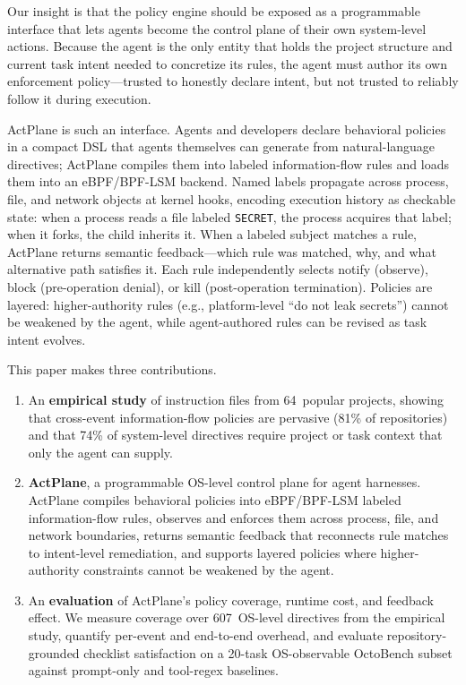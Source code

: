 Our insight is that the policy engine should be exposed as a
programmable interface that lets agents become the control plane of
their own system-level actions. Because the agent is the only entity
that holds the project structure and current task intent needed to
concretize its rules, the agent must author its own enforcement
policy---trusted to honestly declare intent, but not trusted to
reliably follow it during execution.

ActPlane is such an interface. Agents and developers declare behavioral
policies in a compact DSL that agents themselves can generate from
natural-language directives; ActPlane compiles them into labeled
information-flow rules and loads them into an eBPF/BPF-LSM backend. Named
labels propagate across process, file, and network objects at kernel hooks,
encoding execution history as checkable state: when a process reads a file
labeled \texttt{SECRET}, the process acquires that label; when it forks, the
child inherits it. When a labeled subject matches a rule, ActPlane returns
semantic feedback---which rule was matched, why, and what alternative path
satisfies it. Each rule independently selects notify (observe), block
(pre-operation denial), or kill (post-operation termination).
Policies are layered: higher-authority rules (e.g., platform-level
``do not leak secrets'') cannot be weakened by the agent, while
agent-authored rules can be revised as task intent evolves.

This paper makes three contributions.

\begin{enumerate}
\item An \textbf{empirical study} of instruction files from 64~popular
projects, showing that cross-event information-flow policies are pervasive
(81\% of repositories) and that 74\% of system-level directives require
project or task context that only the agent can supply.

\item \textbf{ActPlane}, a programmable OS-level control plane for agent
harnesses. ActPlane compiles behavioral policies into eBPF/BPF-LSM labeled
information-flow rules, observes and enforces them across process, file,
and network boundaries, returns semantic feedback that reconnects rule
matches to intent-level remediation, and supports layered policies where
higher-authority constraints cannot be weakened by the agent.

\item An \textbf{evaluation} of ActPlane's policy coverage, runtime
cost, and feedback effect. We measure coverage over 607~OS-level
directives from the empirical study, quantify per-event and end-to-end
overhead, and evaluate repository-grounded checklist satisfaction on a
20-task OS-observable OctoBench subset against prompt-only and tool-regex
baselines.
\end{enumerate}
